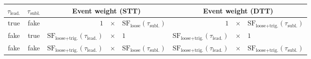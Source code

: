 \begin{tabular}{cc@{\hskip 2em}rcl@{\hskip 2em}rcl}
  \toprule
  $\tau_{\text{lead.}}$ & $\tau_{\text{subl.}}$ & \multicolumn{3}{c}{Event weight (STT)} & \multicolumn{3}{c}{Event weight (DTT)} \\
  \midrule
  true & fake & $1$ & $\times$ & $\text{SF}_\text{loose}(\tau_{\text{subl.}})$
              & $1$ & $\times$ & $\text{SF}_\text{loose+trig.}(\tau_{\text{subl.}})$ \\[0.2em]

  fake & true & $\text{SF}_\text{loose+trig.}(\tau_{\text{lead.}})$ & $\times$ & $1$
              & $\text{SF}_\text{loose+trig.}(\tau_{\text{lead.}})$ & $\times$ & $1$ \\[0.2em]

  fake & fake & $\text{SF}_\text{loose+trig.}(\tau_{\text{lead.}})$ & $\times$ & $\text{SF}_\text{loose}(\tau_{\text{subl.}})$
              & $\text{SF}_\text{loose+trig.}(\tau_{\text{lead.}})$ & $\times$ & $\text{SF}_\text{loose+trig.}(\tau_{\text{subl.}})$ \\
  \bottomrule
\end{tabular}

